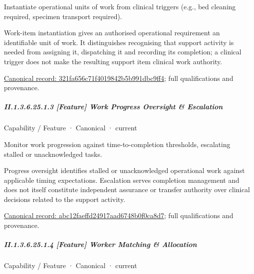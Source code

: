 Instantiate operational units of work from clinical triggers (e.g., bed cleaning required, specimen transport required).



Work-item instantiation gives an authorised operational requirement an identifiable unit of work. It distinguishes recognising that support activity is needed from assigning it, dispatching it and recording its completion; a clinical trigger does not make the resulting support item clinical work authority.


{\footnotesize \href{../../../../../../../continuum/strategy/capability/feature/321fa656c71f4019842b5b991dbc9ff4.md}{Canonical record: 321fa656c71f4019842b5b991dbc9ff4}; full qualifications and provenance.}\par
\subparagraph*{II.1.3.6.25.1.3 [Feature] Work Progress Oversight \& Escalation}
\label{navigation:II.1.3.6.25.1.3}

\label{element:abc12faeffd24917aad6748b0f0ca8d7}
{\small Capability / Feature · Canonical · current}\par

Monitor work progression against time-to-completion thresholds, escalating stalled or unacknowledged tasks.



Progress oversight identifies stalled or unacknowledged operational work against applicable timing expectations. Escalation serves completion management and does not itself constitute independent assurance or transfer authority over clinical decisions related to the support activity.


{\footnotesize \href{../../../../../../../continuum/strategy/capability/feature/abc12faeffd24917aad6748b0f0ca8d7.md}{Canonical record: abc12faeffd24917aad6748b0f0ca8d7}; full qualifications and provenance.}\par
\subparagraph*{II.1.3.6.25.1.4 [Feature] Worker Matching \& Allocation}
\label{navigation:II.1.3.6.25.1.4}

\label{element:caac8a83dc974cdb9c9bc1b778b9cee7}
{\small Capability / Feature · Canonical · current}\par

